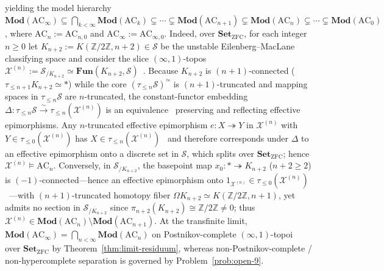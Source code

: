 yielding the model hierarchy $\mathbf{Mod}(\mathrm{AC}_\infty) \subseteq  \bigcap_{k < \infty} \mathbf{Mod}(\mathrm{AC}_k) \subsetneq  \cdots \subsetneq  \mathbf{Mod}(\mathrm{AC}_{n+1}) \subsetneq  \mathbf{Mod}(\mathrm{AC}_n) \subsetneq  \cdots \subsetneq  \mathbf{Mod}(\mathrm{AC}_0)$, where $\mathrm{AC}_n := \mathrm{AC}_{n, 0}$ and $\mathrm{AC}_\infty := \mathrm{AC}_{\infty, 0}$. Indeed, over $\mathbf{Set}_{\mathrm{ZFC}}$, for each integer $n \ge 0$ let $K_{n+2} := K(\mathbb{Z}/2\mathbb{Z}, n+2) \in \mathcal{S}$ be the unstable Eilenberg--MacLane classifying space and consider the slice $(\infty,1)$-topos $\mathcal{X}^{(n)} := \mathcal{S}_{/K_{n+2}} \simeq \mathbf{Fun}(K_{n+2}, \mathcal{S})$~\cite[Proposition~6.3.5.1]{Lurie09}. Because $K_{n+2}$ is $(n+1)$-connected ($\tau_{\le n+1}K_{n+2} \simeq *$) while the core $(\tau_{\le n}\mathcal{S})^{\simeq}$ is $(n+1)$-truncated and mapping spaces in $\tau_{\le n}\mathcal{S}$ are $n$-truncated, the constant-functor embedding $\Delta : \tau_{\le n}\mathcal{S} \xrightarrow{\sim} \tau_{\le n}(\mathcal{X}^{(n)})$ is an equivalence~\cite[Proposition~5.5.6.18]{Lurie09} preserving and reflecting effective epimorphisms. Any $n$-truncated effective epimorphism $e : X \twoheadrightarrow Y$ in $\mathcal{X}^{(n)}$ with $Y \in \tau_{\le 0}(\mathcal{X}^{(n)})$ has $X \in \tau_{\le n}(\mathcal{X}^{(n)})$~\cite[Lemma~5.5.6.14]{Lurie09} and therefore corresponds under $\Delta$ to an effective epimorphism onto a discrete set in $\mathcal{S}$, which splits over $\mathbf{Set}_{\mathrm{ZFC}}$; hence $\mathcal{X}^{(n)} \models \mathrm{AC}_n$. Conversely, in $\mathcal{S}_{/K_{n+2}}$, the basepoint map $x_0 : * \twoheadrightarrow K_{n+2}$ ($n+2 \ge 2$) is $(-1)$-connected---hence an effective epimorphism onto $1_{\mathcal{X}^{(n)}} \in \tau_{\le 0}(\mathcal{X}^{(n)})$~\cite[Proposition~7.2.1.14]{Lurie09}---with $(n+1)$-truncated homotopy fiber $\Omega K_{n+2} \simeq K(\mathbb{Z}/2\mathbb{Z}, n+1)$, yet admits no section in $\mathcal{S}_{/K_{n+2}}$ since $\pi_{n+2}(K_{n+2}) \cong \mathbb{Z}/2\mathbb{Z} \neq 0$; thus $\mathcal{X}^{(n)} \in \mathbf{Mod}(\mathrm{AC}_n) \setminus \mathbf{Mod}(\mathrm{AC}_{n+1})$. At the transfinite limit, $\mathbf{Mod}(\mathrm{AC}_\infty) = \bigcap_{n < \infty} \mathbf{Mod}(\mathrm{AC}_n)$ on Postnikov-complete $(\infty,1)$-topoi~\cite[\S 5.5.6, \S 7.2.1]{Lurie09} over $\mathbf{Set}_{\mathrm{ZFC}}$ by Theorem~\ref{thm:limit-residuum}, whereas non-Postnikov-complete / non-hypercomplete separation is governed by Problem~\ref{prob:open-9}.


